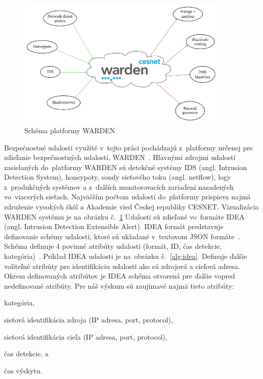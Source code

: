 \documentclass[thesismargins, thesislinespacing, openright, upjsfrontpage]{rnthesis}
\begin{document}
\begin{figure}[h]
  \centering
  \includegraphics[width=0.9\textwidth]{images/warden.png}
  \caption{Schéma platformy WARDEN~\cite{bajtovs2018network}}
  \label{fig:warden}
\end{figure}

Bezpečnostné udalosti využité v~tejto práci pochádzajú z~platformy určenej pre zdieľanie bezpečnostných udalostí, WARDEN~\cite{kacha2015warden}. Hlavnými zdrojmi udalostí zasielaných do~platformy WARDEN sú detekčné systémy IDS (angl. Intrusion Detection System), honeypoty, sondy sieťového toku (angl. netflow), logy z~produkčných systémov a z~ďalších monitorovacích zariadení nasadených vo~viacerých sieťach. Najväčším počtom udalostí do~platformy prispieva najmä združenie vysokých škôl a Akademie vied Českej republiky CESNET. Vizualizácia WARDEN systému je na obrázku č.~\ref{fig:warden} Udalosti sú zdieľané vo~formáte IDEA (angl. Intrusion Detection Extensible Alert). IDEA formát predstavuje definovanie schémy udalosti, ktoré sú ukladané v~textovom JSON formáte~\cite{pezoa2016foundations}. Schéma definuje 4 povinné atribúty udalosti (formát, ID, čas detekcie, kategória)~\cite{kacha2014idea}. Príklad IDEA udalosti je na~obrázku č.~\ref{alg:idea}. Definuje ďalšie voliteľné atribúty pre identifikáciu udalosti ako sú zdrojová a cieľová adresa. Okrem definovaných atribútov je IDEA schéma otvorená pre ďalšie vopred nedefinované atribúty. Pre náš výskum sú zaujímavé najmä tieto atribúty:

\begin{compactenum}
\item kategória, 
\item sieťová identifikácia zdroja (IP adresa, port, protocol), 
\item sieťová identifikácia cieľa (IP adresa, port, protocol), 
\item čas detekcie, a
\item čas výskytu.
\end{compactenum}
\end{document}
